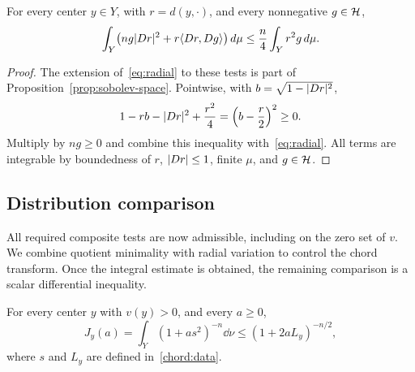 \begin{lemma}
\label{lem:completed-radial}
For every center $y\in Y$, with $r=d(y,\cdot)$, and every
nonnegative $g\in\mathcal H$,
\begin{equation}\label{chord:completed-radial}
 \int_Y\bigl(ng\lvert Dr\rvert^2+r\langle Dr,Dg\rangle\bigr)\,d\mu
       \le\frac n4\int_Y r^2g\,d\mu.
\end{equation}
\end{lemma}

\begin{proof}
The extension of~\eqref{eq:radial} to these tests is part of
Proposition~\ref{prop:sobolev-space}. Pointwise, with
$b=\sqrt{1-\lvert Dr\rvert^2}$,
\[
 1-rb-\lvert Dr\rvert^2+\frac{r^2}{4}
                   =\left(b-\frac r2\right)^2\ge0.
\]
Multiply by $ng\ge0$ and combine this inequality
with~\eqref{eq:radial}. All terms are integrable by boundedness
of $r$, $\lvert Dr\rvert\le1$, finite $\mu$, and $g\in\mathcal H$.
\end{proof}

\subsection{Distribution comparison}

All required composite tests are now admissible, including on the zero
set of $v$. We combine quotient minimality with radial variation to
control the chord transform. Once the integral estimate is obtained,
the remaining comparison is a scalar differential inequality.

\begin{proposition}\label{prop:chord-transform}
For every center $y$ with $v(y)>0$, and every $a\ge0$,
\begin{equation}\label{eq:chord-transform}
 J_y(a)=\int_Y(1+as^2)^{-n}\dd\nu
                  \le(1+2aL_y)^{-n/2},
\end{equation}
where $s$ and $L_y$ are defined in~\eqref{chord:data}.
\end{proposition}

